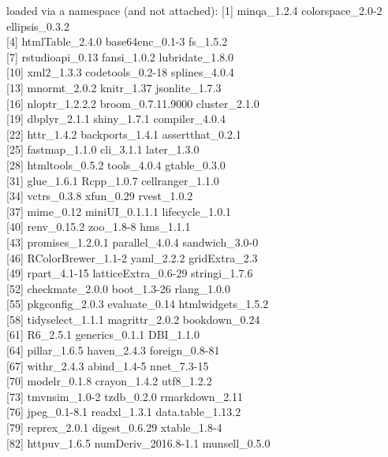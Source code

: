 \documentclass[
  english,
  man,floatsintext]{apa7}
\begin{document}
loaded via a namespace (and not attached):
{[}1{]} minqa\_1.2.4 colorspace\_2.0-2 ellipsis\_0.3.2\\
{[}4{]} htmlTable\_2.4.0 base64enc\_0.1-3 fs\_1.5.2\\
{[}7{]} rstudioapi\_0.13 fansi\_1.0.2 lubridate\_1.8.0\\
{[}10{]} xml2\_1.3.3 codetools\_0.2-18 splines\_4.0.4\\
{[}13{]} mnormt\_2.0.2 knitr\_1.37 jsonlite\_1.7.3\\
{[}16{]} nloptr\_1.2.2.2 broom\_0.7.11.9000 cluster\_2.1.0\\
{[}19{]} dbplyr\_2.1.1 shiny\_1.7.1 compiler\_4.0.4\\
{[}22{]} httr\_1.4.2 backports\_1.4.1 assertthat\_0.2.1\\
{[}25{]} fastmap\_1.1.0 cli\_3.1.1 later\_1.3.0\\
{[}28{]} htmltools\_0.5.2 tools\_4.0.4 gtable\_0.3.0\\
{[}31{]} glue\_1.6.1 Rcpp\_1.0.7 cellranger\_1.1.0\\
{[}34{]} vctrs\_0.3.8 xfun\_0.29 rvest\_1.0.2\\
{[}37{]} mime\_0.12 miniUI\_0.1.1.1 lifecycle\_1.0.1\\
{[}40{]} renv\_0.15.2 zoo\_1.8-8 hms\_1.1.1\\
{[}43{]} promises\_1.2.0.1 parallel\_4.0.4 sandwich\_3.0-0\\
{[}46{]} RColorBrewer\_1.1-2 yaml\_2.2.2 gridExtra\_2.3\\
{[}49{]} rpart\_4.1-15 latticeExtra\_0.6-29 stringi\_1.7.6\\
{[}52{]} checkmate\_2.0.0 boot\_1.3-26 rlang\_1.0.0\\
{[}55{]} pkgconfig\_2.0.3 evaluate\_0.14 htmlwidgets\_1.5.2\\
{[}58{]} tidyselect\_1.1.1 magrittr\_2.0.2 bookdown\_0.24\\
{[}61{]} R6\_2.5.1 generics\_0.1.1 DBI\_1.1.0\\
{[}64{]} pillar\_1.6.5 haven\_2.4.3 foreign\_0.8-81\\
{[}67{]} withr\_2.4.3 abind\_1.4-5 nnet\_7.3-15\\
{[}70{]} modelr\_0.1.8 crayon\_1.4.2 utf8\_1.2.2\\
{[}73{]} tmvnsim\_1.0-2 tzdb\_0.2.0 rmarkdown\_2.11\\
{[}76{]} jpeg\_0.1-8.1 readxl\_1.3.1 data.table\_1.13.2\\
{[}79{]} reprex\_2.0.1 digest\_0.6.29 xtable\_1.8-4\\
{[}82{]} httpuv\_1.6.5 numDeriv\_2016.8-1.1 munsell\_0.5.0\\
\end{document}
